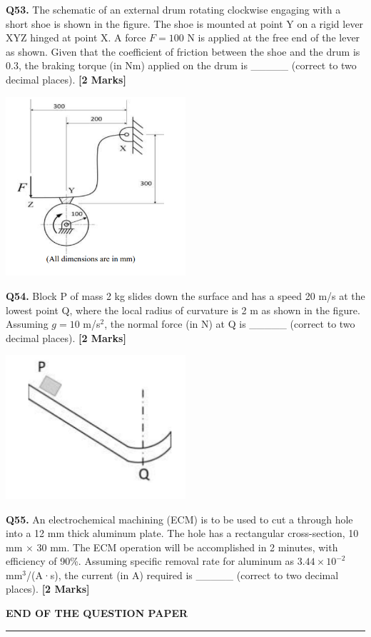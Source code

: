 \documentclass[11pt]{article}
\newcommand{\questionb}[2]{
    \noindent\textbf{Q#2.} #1 \hfill \textbf{[2 Marks]}
}
\begin{document}
\questionb{The schematic of an external drum rotating clockwise engaging with a short shoe is shown in the figure. The shoe is mounted at point Y on a rigid lever XYZ hinged at point X. A force \( F = 100 \) N is applied at the free end of the lever as shown. Given that the coefficient of friction between the shoe and the drum is 0.3, the braking torque (in Nm) applied on the drum is \_\_\_\_\_ (correct to two decimal places).}{53}
\begin{center}
\includegraphics[width=0.5\textwidth]{figures/53.png}
\end{center}
\vspace{0.5cm}

\questionb{Block P of mass 2 kg slides down the surface and has a speed 20 m/s at the lowest point Q, where the local radius of curvature is 2 m as shown in the figure. Assuming \( g = 10 \) m/s\(^2\), the normal force (in N) at Q is \_\_\_\_\_ (correct to two decimal places).}{54}
\begin{center}
\includegraphics[width=0.5\textwidth]{figures/54.png}
\end{center}
\vspace{0.5cm}

\questionb{An electrochemical machining (ECM) is to be used to cut a through hole into a 12 mm thick aluminum plate. The hole has a rectangular cross-section, 10 mm × 30 mm. The ECM operation will be accomplished in 2 minutes, with efficiency of 90\%. Assuming specific removal rate for aluminum as \( 3.44 \times 10^{-2} \) mm\(^3\)/(A·s), the current (in A) required is \_\_\_\_\_ (correct to two decimal places).}{55}
\vspace{0.5cm}

\vspace{5cm}
\begin{center}
\textbf{END OF THE QUESTION PAPER} \\
\rule{\textwidth}{0.5pt}
\end{center}
\end{document}
